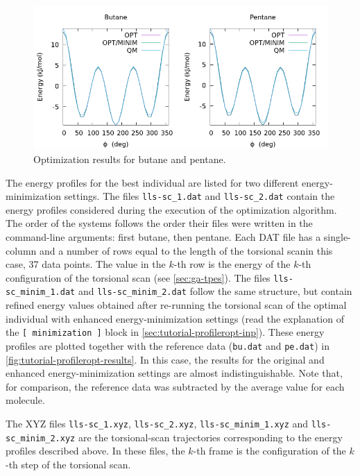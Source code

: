 \documentclass[10pt,a4paper,openany]{memoir}
\numberwithin{equation}{section}
\begin{document}
\begin{figure}[TB]
  \centering
  \includegraphics[width=.8\textwidth]{opt-results}
  \caption{Optimization results for butane and pentane.}
  \label{fig:tutorial-profileropt-results}
\end{figure}

The energy profiles for the best individual are listed for two
different energy-minimization settings. The files
\texttt{lls-sc\_1.dat} and \texttt{lls-sc\_2.dat} contain the energy
profiles considered during the execution of the optimization
algorithm.  The order of the systems follows the order their files
were written in the command-line arguments: first butane, then
pentane. Each DAT file has a single-column and a number of rows equal
to the length of the torsional scan\textemdash{}in this case, 37 data
points. The value in the $k$-th row is the energy of the $k$-th
configuration of the torsional scan (see \autoref{sec:ga-tpes}).  The
files \texttt{lls-sc\_minim\_1.dat} and \texttt{lls-sc\_minim\_2.dat}
follow the same structure, but contain refined energy values obtained
after re-running the torsional scan of the optimal individual with
enhanced energy-minimization settings (read the explanation of the
\texttt{[~minimization~]} block in
\autoref{sec:tutorial-profileropt-inp}). These energy profiles are
plotted together with the reference data (\texttt{bu.dat} and
\texttt{pe.dat}) in \autoref{fig:tutorial-profileropt-results}.  In
this case, the results for the original and enhanced
energy-minimization settings are almost indistinguishable.  Note that,
for comparison, the reference data was subtracted by the average value
for each molecule.

The XYZ files \texttt{lls-sc\_1.xyz}, \texttt{lls-sc\_2.xyz},
\texttt{lls-sc\_minim\_1.xyz} and \texttt{lls-sc\_minim\_2.xyz} are
the torsional-scan trajectories corresponding to the energy profiles
described above. In these files, the $k$-th frame is the configuration
of the $k$-th step of the torsional scan.
\end{document}
